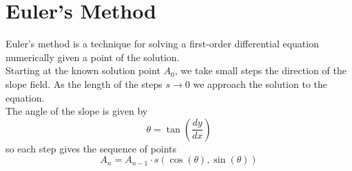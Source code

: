\documentclass{article}
\begin{document}
\section{Euler's Method}

Euler's method is a technique for solving a 
first-order differential equation numerically given a point of the solution.
\\
Starting at the known solution point \(A_0\), we take small steps the direction
of the slope field. As the length of the steps \(s \to 0\)
we approach the solution to the equation. \\
The angle of the slope is given by
\[
    \theta = \tan\left(\frac{dy}{dx}\right)
\]
so each step gives the sequence of points
\[
    A_n = A_{n-1} \cdot s \left(\cos(\theta), \sin(\theta)\right)
\]

\pagebreak

\end{document}
